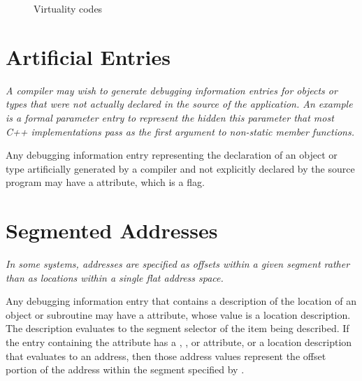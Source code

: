\begin{figure}[here]
\begin{description}
\centering
\item [DW\-\_VIRTUALITY\-\_none]
\item [DW\-\_VIRTUALITY\-\_virtual]
\item [DW\-\_VIRTUALITY\-\_pure\-\_virtual]
\end{description}
\caption{Virtuality codes}
\label{fig:virtualitycodes}
\end{figure}

\section{Artificial Entries}
\label{chap:artificialentries}
\textit{A compiler may wish to generate debugging information entries
for objects or types that were not actually declared in the
source of the application. An example is a formal parameter
entry to represent the hidden this parameter that most C++
implementations pass as the first argument to non-static member
functions.}  

Any debugging information entry representing the
declaration of an object or type artificially generated by
a compiler and not explicitly declared by the source program
may have a  attribute, which is a flag.

\section{Segmented Addresses}
\label{chap:segmentedaddresses}
\textit{In some systems, addresses are specified as offsets within a
given segment rather than as locations within a single flat
address space.}

Any debugging information entry that contains a description
of the location of an object or subroutine may have
a  attribute, whose value is a location
description. The description evaluates to the segment selector
of the item being described. If the entry containing the
 attribute has a , ,
 or  attribute, or a location
description that evaluates to an address, then those address
values represent the offset portion of the address within
the segment specified by .

